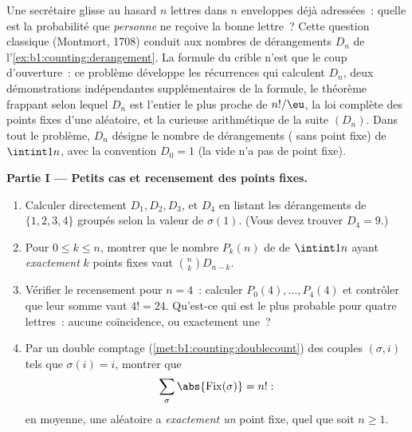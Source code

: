 \begin{problem}\label{pb:b1:counting:1}
Une secrétaire glisse au hasard $n$ lettres dans $n$ enveloppes déjà
adressées~: quelle est la probabilité que \emph{personne} ne reçoive la
bonne lettre~? Cette question classique (Montmort, 1708) conduit aux
nombres de dérangements $D_n$ de l'\cref{ex:b1:counting:derangement}. La
formule du crible n'est que le coup d'ouverture~: ce problème développe
les récurrences qui calculent $D_n$, deux démonstrations indépendantes
supplémentaires de la formule, le théorème frappant selon lequel $D_n$
est l'entier le plus proche de $n!/\eu$, la loi complète des points fixes
d'une  aléatoire, et la curieuse arithmétique de la suite
$(D_n)$.
Dans tout le problème, $D_n$ désigne le nombre de dérangements
( sans point fixe) de $\intint1n$, avec la convention $D_0 = 1$
(la  vide n'a pas de point fixe).

\medskip
\noindent\textbf{Partie I --- Petits cas et recensement des points
fixes.}
\begin{enumerate}
  \item Calculer directement $D_1, D_2, D_3$, et $D_4$ en listant les
        dérangements de $\{1, 2, 3, 4\}$ groupés selon la valeur de
        $\sigma(1)$. (Vous devez trouver $D_4 = 9$.)
  \item Pour $0 \leq k \leq n$, montrer que le nombre $P_k(n)$ de
         de $\intint1n$ ayant \emph{exactement} $k$ points
        fixes vaut $\binom nk D_{n-k}$.
  \item Vérifier le recensement pour $n = 4$~: calculer $P_0(4), \dots,
        P_4(4)$ et contrôler que leur somme vaut $4! = 24$. Qu'est-ce qui
        est le plus probable pour quatre lettres~: aucune coïncidence, ou
        exactement une~?
  \item Par un double comptage (\cref{met:b1:counting:doublecount})
        des couples $(\sigma, i)$ tels que $\sigma(i) = i$, montrer que
        \[
        \sum_{\sigma} \abs{\mathrm{Fix}(\sigma)} = n! :
        \]
        en moyenne, une  aléatoire a \emph{exactement un}
        point fixe, quel que soit $n \geq 1$.
\end{enumerate}


\end{problem}
